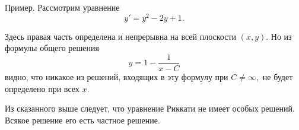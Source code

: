 Пример. Рассмотрим уравнение
$$y' = y^{2} - 2 y + 1.$$

Здесь правая часть определена и непрерывна на всей плоскости $\left( x, y \right)$. Но из формулы общего решения
$$y = 1 - \dfrac{1}{x - C}$$
видно, что никакое из решений, входящих в эту формулу при $C \neq \infty,$ не будет определено при всех $x$.

Из сказанного выше следует, что уравнение Риккати не имеет особых решений. Всякое решение его есть частное решение.








